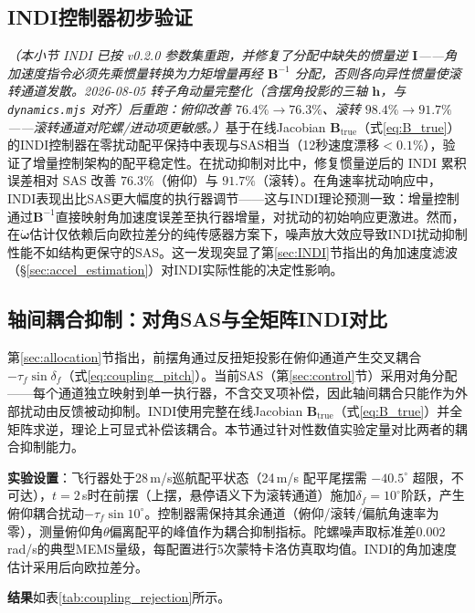 \subsection{INDI控制器初步验证}

\textit{（本小节 INDI 已按 v0.2.0 参数集重跑，并修复了分配中缺失的惯量逆 $\mathbf{I}$——角加速度指令必须先乘惯量转换为力矩增量再经 $\mathbf{B}^{-1}$ 分配，否则各向异性惯量使滚转通道发散。2026-08-05 转子角动量完整化（含摆角投影的三轴 $\mathbf{h}$，与 \texttt{dynamics.mjs} 对齐）后重跑：俯仰改善 $76.4\%\rightarrow76.3\%$、滚转 $98.4\%\rightarrow91.7\%$——滚转通道对陀螺/进动项更敏感。）}基于在线Jacobian $\mathbf{B}_{\mathrm{true}}$（式\ref{eq:B_true}）的INDI控制器在零扰动配平保持中表现与SAS相当（12秒速度漂移$<0.1\%$），验证了增量控制架构的配平稳定性。在扰动抑制对比中，修复惯量逆后的 INDI 累积误差相对 SAS 改善 $76.3\%$（俯仰）与 $91.7\%$（滚转）。在角速率扰动响应中，INDI表现出比SAS更大幅度的执行器调节——这与INDI理论预测一致：增量控制通过$\mathbf{B}^{-1}$直接映射角加速度误差至执行器增量，对扰动的初始响应更激进。然而，在$\dot{\boldsymbol{\omega}}$估计仅依赖后向欧拉差分的纯传感器方案下，噪声放大效应导致INDI扰动抑制性能不如结构更保守的SAS。这一发现突显了第\ref{sec:INDI}节指出的角加速度滤波（§\ref{sec:accel_estimation}）对INDI实际性能的决定性影响。

\subsection{轴间耦合抑制：对角SAS与全矩阵INDI对比}
\label{sec:coupling_rejection}

第\ref{sec:allocation}节指出，前摆角通过反扭矩投影在俯仰通道产生交叉耦合$-\tau_f\sin\delta_f$（式\ref{eq:coupling_pitch}）。当前SAS（第\ref{sec:control}节）采用对角分配——每个通道独立映射到单一执行器，不含交叉项补偿，因此轴间耦合只能作为外部扰动由反馈被动抑制。INDI使用完整在线Jacobian $\mathbf{B}_{\mathrm{true}}$（式\ref{eq:B_true}）并全矩阵求逆，理论上可显式补偿该耦合。本节通过针对性数值实验定量对比两者的耦合抑制能力。

\textbf{实验设置}：飞行器处于28\,m/s巡航配平状态（24\,m/s 配平尾摆需 $-40.5^\circ$ 超限，不可达），$t=2$\,s时在前摆（上摆，悬停语义下为滚转通道）施加$\delta_f=10^\circ$阶跃，产生俯仰耦合扰动$-\tau_f\sin 10^\circ$。控制器需保持其余通道（俯仰/滚转/偏航角速率为零），测量俯仰角$\theta$偏离配平的峰值作为耦合抑制指标。陀螺噪声取标准差$0.002$\,rad/s的典型MEMS量级，每配置进行5次蒙特卡洛仿真取均值。INDI的角加速度估计采用后向欧拉差分。

\textbf{结果}如表\ref{tab:coupling_rejection}所示。


